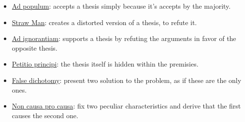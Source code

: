 \documentclass{subfiles}
\begin{document}
\begin{itemize}
\begin{itemize}
                \item \underline{\foreignlanguage{latin}{Ad populum}}:
                    accepts a thesis simply because it's accepts by the majority.
                
                \item \underline{Straw Man}:
                    creates a distorted version of a thesis, to refute it.

                \item \underline{\foreignlanguage{latin}{Ad ignorantiam}}:
                    supports a thesis by refuting the arguments in favor of the opposite thesis.

                \item \underline{\foreignlanguage{latin}{Petitio principi}}: 
                    the thesis itself is hidden within the premisies.

                \item \underline{False dichotomy}: present two solution to the problem, as if these are the only ones.

                \item \underline{\foreignlanguage{latin}{Non causa pro causa}}: 
                    fix two peculiar characteristics and derive that the first causes the second one.
            \end{itemize}
    \end{itemize}
\end{document}
